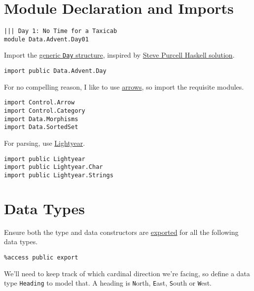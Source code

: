 \newpage

\section{Module Declaration and
Imports}\label{module-declaration-and-imports}

\begin{verbatim}
||| Day 1: No Time for a Taxicab
module Data.Advent.Day01
\end{verbatim}

Import the
\href{https://github.com/yurrriq/advent-of-idris/blob/master/src/Data/Advent/Day.idr}{generic
\texttt{Day} structure}, inspired by
\href{https://github.com/purcell/adventofcode2016}{Steve Purcell Haskell
solution}.

\begin{verbatim}
import public Data.Advent.Day
\end{verbatim}

For no compelling reason, I like to use
\href{https://www.haskell.org/arrows/}{arrows}, so import the requisite
modules.

\begin{verbatim}
import Control.Arrow
import Control.Category
import Data.Morphisms
import Data.SortedSet
\end{verbatim}

For parsing, use \href{https://github.com/ziman/lightyear}{Lightyear}.

\begin{verbatim}
import public Lightyear
import public Lightyear.Char
import public Lightyear.Strings
\end{verbatim}

\section{Data Types}\label{data-types}

Ensure both the type and data constructors are
\href{http://docs.idris-lang.org/en/latest/tutorial/modules.html\#meaning-for-data-types}{exported}
for all the following data types.

\begin{verbatim}
%access public export
\end{verbatim}

We'll need to keep track of which cardinal direction we're facing, so
define a data type \texttt{Heading} to model that. A
heading is \texttt{N}orth, \texttt{E}ast,
\texttt{S}outh or \texttt{W}est.

